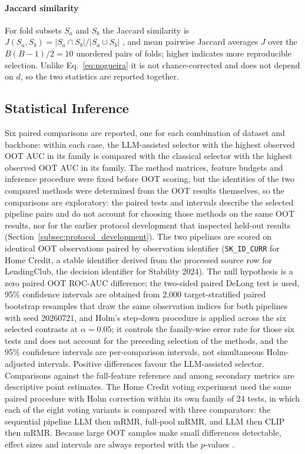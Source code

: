\documentclass[final,5p,twocolumn]{elsarticle}
\begin{document}
\paragraph{Jaccard similarity}
For fold subsets $S_a$ and $S_b$ the Jaccard similarity is $J(S_a,S_b)=|S_a\cap S_b|/|S_a\cup S_b|$ \cite{jaccard1901}, and mean pairwise Jaccard averages $J$ over the $B(B-1)/2=10$ unordered pairs of folds; higher indicates more reproducible selection. Unlike Eq.~\eqref{eq:nogueira} it is not chance-corrected and does not depend on $d$, so the two statistics are reported together.

\subsection{Statistical Inference}
\label{subsec:inference}

Six paired comparisons are reported, one for each combination of dataset and backbone: within each case, the LLM-assisted selector with the highest observed OOT AUC in its family is compared with the classical selector with the highest observed OOT AUC in its family. The method matrices, feature budgets and inference procedure were fixed before OOT scoring, but the identities of the two compared methods were determined from the OOT results themselves, so the comparisons are exploratory: the paired tests and intervals describe the selected pipeline pairs and do not account for choosing those methods on the same OOT results, nor for the earlier protocol development that inspected held-out results (Section~\ref{subsec:protocol_development}). The two pipelines are scored on identical OOT observations paired by observation identifier (\texttt{SK\_\allowbreak ID\_\allowbreak CURR} for Home Credit, a stable identifier derived from the processed source row for LendingClub, the decision identifier for Stability 2024). The null hypothesis is a zero paired OOT ROC-AUC difference; the two-sided paired DeLong test \cite{delong1988} is used, 95\% confidence intervals are obtained from 2,000 target-stratified paired bootstrap resamples that draw the same observation indices for both pipelines \cite{efron1993} with seed 20260721, and Holm's step-down procedure \cite{holm1979} is applied across the six selected contrasts at $\alpha=0.05$; it controls the family-wise error rate for those six tests and does not account for the preceding selection of the methods, and the 95\% confidence intervals are per-comparison intervals, not simultaneous Holm-adjusted intervals. Positive differences favour the LLM-assisted selector. Comparisons against the full-feature reference and among secondary metrics are descriptive point estimates. The Home Credit voting experiment used the same paired procedure with Holm correction within its own family of 24 tests, in which each of the eight voting variants is compared with three comparators: the sequential pipeline LLM then mRMR, full-pool mRMR, and LLM then CLIP then mRMR. Because large OOT samples make small differences detectable, effect sizes and intervals are always reported with the $p$-values \cite{demsar2006}.
\end{document}
